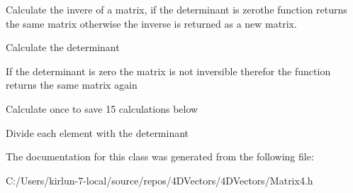 Calculate the invere of a matrix, if the determinant is zerothe function returns the same matrix otherwise the inverse is returned as a new matrix. 

Calculate the determinant

If the determinant is zero the matrix is not inversible therefor the function returns the same matrix again

Calculate once to save 15 calculations below

Divide each element with the determinant 

The documentation for this class was generated from the following file\+:\begin{DoxyCompactItemize}
\item 
C\+:/\+Users/kirlun-\/7-\/local/source/repos/4\+D\+Vectors/4\+D\+Vectors/Matrix4.\+h\end{DoxyCompactItemize}

